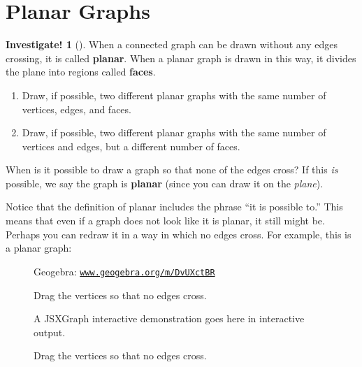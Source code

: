 \documentclass[10pt,]{book}
\newcommand{\mono}[1]{\texttt{#1}}
\newcommand{\terminology}[1]{\textbf{#1}}
\theoremstyle{plain}
\theoremstyle{definition}
\theoremstyle{definition}
\theoremstyle{definition}
\newtheorem{investigation}[project]{Investigate!}
\theoremstyle{definition}
\numberwithin{equation}{chapter}
\newcommand{\vtx}[2]{node[fill,circle,inner sep=0pt, minimum size=4pt,label=#1:#2]{}}
\renewcommand{\v}{\vtx{above}{}}
\begin{document}
\section[{Planar Graphs}]{Planar Graphs}\label{sec_planar}
\begin{investigation}[]\label{investigation-20}
\hypertarget{p-1587}{}%
When a connected graph can be drawn without any edges crossing, it is called \terminology{planar}. When a planar graph is drawn in this way, it divides the plane into regions called \terminology{faces}. %
\begin{enumerate}
\item\hypertarget{li-719}{}\hypertarget{p-1588}{}%
Draw, if possible, two different planar graphs with the same number of vertices, edges, and faces.%
\item\hypertarget{li-720}{}\hypertarget{p-1589}{}%
Draw, if possible, two different planar graphs with the same number of vertices and edges, but a different number of faces.%
\end{enumerate}
%
\end{investigation}
\hypertarget{p-1590}{}%
When is it possible to draw a graph so that none of the edges cross? If this \emph{is} possible, we say the graph is \terminology{planar} (since you can draw it on the \emph{plane}).%
\par
\hypertarget{p-1591}{}%
Notice that the definition of planar includes the phrase ``it is possible to.'' This means that even if a graph does not look like it is planar, it still might be. Perhaps you can redraw it in a way in which no edges cross. For example, this is a planar graph:%
\begin{figure}
\centering
{
}
\centerline{Geogebra: \href{https://www.geogebra.org/m/DvUXctBR}{\mono{www.geogebra.org/m/DvUXctBR}}}
\caption{Drag the vertices so that no edges cross.\label{figure-1}}
\end{figure}
\begin{figure}
\centering
\par\smallskip\centerline{A JSXGraph interactive demonstration goes here in interactive output.}\smallskip
\caption{Drag the vertices so that no edges cross.\label{figure-2}}
\end{figure}
\end{document}
